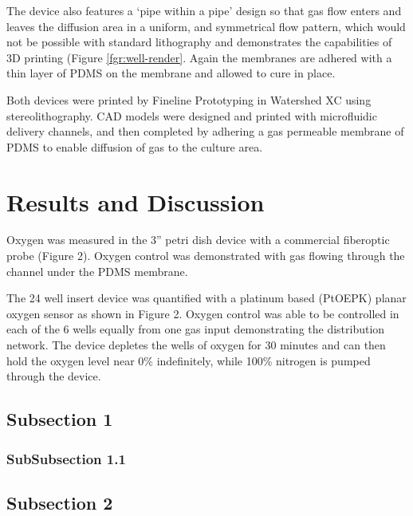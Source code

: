 The device also features a ‘pipe within a pipe’ design so that gas flow enters and leaves the diffusion area in a uniform, and symmetrical flow pattern, which would not be possible with standard lithography and demonstrates the capabilities of 3D printing (Figure \ref{fgr:well-render}.
Again the membranes are adhered with a thin layer of PDMS on the membrane and allowed to cure in place.

Both devices were printed by Fineline Prototyping in Watershed XC using stereolithography.
CAD models were designed and printed with microfluidic delivery channels, and then completed by 
adhering a gas permeable membrane of PDMS to enable diffusion of gas to the culture area. 



\section*{Results and Discussion}

Oxygen was measured in the 3” petri dish device with a commercial fiber­optic probe (Figure 2).
Oxygen control was demonstrated with gas flowing through the channel under the PDMS membrane.

The 24 well insert device was quantified with a platinum based (PtOEPK) planar oxygen sensor as shown in Figure 2.
Oxygen control was able to be controlled in each of the 6 wells equally from one gas input demonstrating the distribution network.
The device depletes the wells of oxygen for 30 minutes and can then hold the oxygen level near 0\% indefinitely, while 100\% nitrogen is pumped through the device. 

\subsection*{Subsection 1}

\subsubsection*{SubSubsection 1.1}

\subsection*{Subsection 2}

